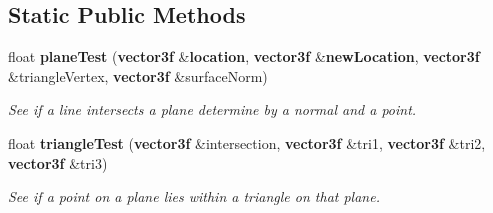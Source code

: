 \subsection*{Static Public Methods}
\begin{CompactItemize}
\item 
{}
float {\bf plane\-Test} ({\bf vector3f} \&{\bf location}, {\bf vector3f} \&{\bf new\-Location}, {\bf vector3f} \&triangle\-Vertex, {\bf vector3f} \&surface\-Norm)\label{classpointMass_d0}

\begin{CompactList}\small\item\em See if a line intersects a plane determine by a normal and a point.\item\end{CompactList}\item 
{}
float {\bf triangle\-Test} ({\bf vector3f} \&intersection, {\bf vector3f} \&tri1, {\bf vector3f} \&tri2, {\bf vector3f} \&tri3)\label{classpointMass_d1}

\begin{CompactList}\small\item\em See if a point on a plane lies within a triangle on that plane.\item\end{CompactList}\end{CompactItemize}
